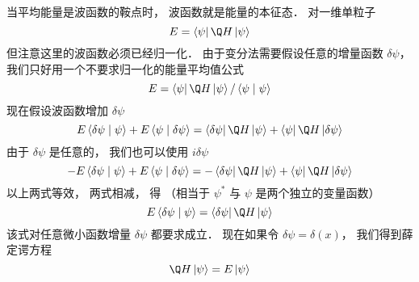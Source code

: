 
当平均能量是波函数的鞍点时， 波函数就是能量的本征态． 对一维单粒子
 \begin{equation}
E = \left\langle \psi  \right|\Q H\left| \psi  \right\rangle 
\end{equation}
但注意这里的波函数必须已经归一化． 由于变分法需要假设任意的增量函数 $\delta \psi $，  我们只好用一个不要求归一化的能量平均值公式
 \begin{equation}
E = \left\langle \psi  \right|\Q H\left| \psi  \right\rangle /\left\langle {\psi }
 \mathrel{\left | {\vphantom {\psi  \psi }}
 \right. \kern-\nulldelimiterspace}
 {\psi } \right\rangle 
\end{equation}
现在假设波函数增加 $\delta \psi $ 
 \begin{equation}
E\left\langle {\delta \psi }
 \mathrel{\left | {\vphantom {{\delta \psi } \psi }}
 \right. \kern-\nulldelimiterspace}
 {\psi } \right\rangle  + E\left\langle {\psi }
 \mathrel{\left | {\vphantom {\psi  {\delta \psi }}}
 \right. \kern-\nulldelimiterspace}
 {\delta \psi } \right\rangle  = \left\langle {\delta \psi } \right|\Q H\left| \psi  \right\rangle  + \left\langle \psi  \right|\Q H\left| {\delta \psi } \right\rangle 
\end{equation}
由于 $\delta \psi $ 是任意的， 我们也可以使用 $i\delta \psi $ 
 \begin{equation}
 - E\left\langle {\delta \psi }
 \mathrel{\left | {\vphantom {{\delta \psi } \psi }}
 \right. \kern-\nulldelimiterspace}
 {\psi } \right\rangle  + E\left\langle {\psi }
 \mathrel{\left | {\vphantom {\psi  {\delta \psi }}}
 \right. \kern-\nulldelimiterspace}
 {\delta \psi } \right\rangle  =  - \left\langle {\delta \psi } \right|\Q H\left| \psi  \right\rangle  + \left\langle \psi  \right|\Q H\left| {\delta \psi } \right\rangle 
\end{equation}
以上两式等效， 两式相减， 得 （相当于 ${\psi ^ * }$ 与 $\psi $ 是两个独立的变量函数）
 \begin{equation}
E\left\langle {\delta \psi }
 \mathrel{\left | {\vphantom {{\delta \psi } \psi }}
 \right. \kern-\nulldelimiterspace}
 {\psi } \right\rangle  = \left\langle {\delta \psi } \right|\Q H\left| \psi  \right\rangle 
\end{equation}
该式对任意微小函数增量 $\delta \psi $ 都要求成立． 现在如果令 $\delta \psi  = \delta (x)$，  我们得到薛定谔方程
 \begin{equation}
\Q H\left| \psi  \right\rangle  = E\left| \psi  \right\rangle 
\end{equation}
